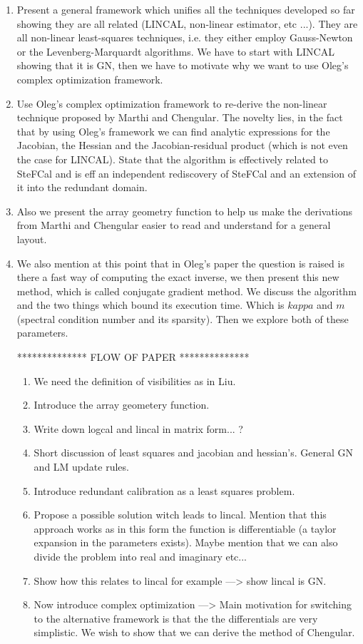 \documentclass[a4paper,fleqn,usenatbib]{mnras}
\begin{document}
\begin{enumerate}
 \item Present a general framework which unifies all the techniques developed so far showing they are all related (LINCAL, non-linear estimator, etc ...). They are all non-linear
 least-squares techniques, i.e. they either employ Gauss-Newton or the Levenberg-Marquardt algorithms. We have to start with LINCAL showing that it is GN, then we have to motivate 
 why we want to use Oleg's complex optimization framework.
 \item Use Oleg's complex optimization framework to re-derive the non-linear technique proposed by Marthi and Chengular. The novelty lies, in the fact that by using Oleg's
 framework we can find analytic expressions for the Jacobian, the Hessian and the Jacobian-residual product (which is not even the case for LINCAL). State that the algorithm is 
 effectively related to SteFCal and is eff an independent rediscovery of SteFCal and an extension of it into the redundant domain.
 \item Also we present the array geometry function to help us make the derivations from Marthi and Chengular easier to read and understand for a general layout.
 \item We also mention at this point that in Oleg's paper the question is raised is there a fast way of computing the exact inverse, we then present this new method, which is called
 conjugate gradient method. We discuss the algorithm and the two things which bound its execution time. Which is $kappa$ and $m$ (spectral condition number and its sparsity). Then
 we explore both of these parameters.
 
 **************
 FLOW OF PAPER
 **************
 
 \begin{enumerate}
 \item We need the definition of visibilities as in Liu.
 \item Introduce the array geometery function.
 \item Write down logcal and lincal in matrix form... ?
 \item Short discussion of least squares and jacobian and hessian's. General GN and LM update rules.
 \item Introduce redundant calibration as a least squares problem.
 \item Propose a possible solution witch leads to lincal. Mention that this approach works as in this form the function is differentiable (a taylor expansion in the 
 parameters exists). Maybe mention that we can also divide the problem into real and imaginary etc...
 \item Show how this relates to lincal for example ---> show lincal is GN.
 \item Now introduce complex optimization ---> Main motivation for switching to the alternative framework is that the the differentials are very simplistic. We wish to show that
 we can derive the method of Chengular.
 \end{enumerate}
 

\end{enumerate}
\end{document}
